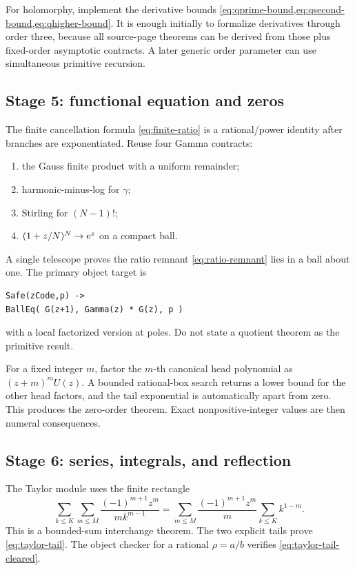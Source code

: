 For holomorphy, implement the derivative bounds
\cref{eq:qprime-bound,eq:qsecond-bound,eq:qhigher-bound}.  It is enough initially
to formalize derivatives through order three, because all source-page theorems
can be derived from those plus fixed-order asymptotic contracts.  A later
generic order parameter can use simultaneous primitive recursion.

\subsection{Stage 5: functional equation and zeros}

The finite cancellation formula \cref{eq:finite-ratio} is a rational/power
identity after branches are exponentiated.  Reuse four Gamma contracts:

\begin{enumerate}
\item the Gauss finite product with a uniform remainder;
\item harmonic-minus-log for \(\gamma\);
\item Stirling for \((N-1)!\);
\item \((1+z/N)^N\to\mathrm e^z\) on a compact ball.
\end{enumerate}
A single telescope proves the ratio remnant \cref{eq:ratio-remnant} lies in a
ball about one.  The primary object target is
\begin{lstlisting}[language={}]
Safe(zCode,p) ->
BallEq( G(z+1), Gamma(z) * G(z), p )
\end{lstlisting}
with a local factorized version at poles.  Do not state a quotient theorem as
the primitive result.

For a fixed integer \(m\), factor the \(m\)-th canonical head polynomial as
\((z+m)^mU(z)\).  A bounded rational-box search returns a lower bound for the
other head factors, and the tail exponential is automatically apart from zero.
This produces the zero-order theorem.  Exact nonpositive-integer values are
then numeral consequences.

\subsection{Stage 6: series, integrals, and reflection}

The Taylor module uses the finite rectangle
\[
 \sum_{k\le K}\sum_{m\le M}
 \frac{(-1)^{m+1}z^m}{mk^{m-1}}
 =\sum_{m\le M}\frac{(-1)^{m+1}z^m}{m}
 \sum_{k\le K}k^{1-m}.
\]
This is a bounded-sum interchange theorem.  The two explicit tails prove
\cref{eq:taylor-tail}.  The object checker for a rational
\(\rho=a/b\) verifies \cref{eq:taylor-tail-cleared}.

